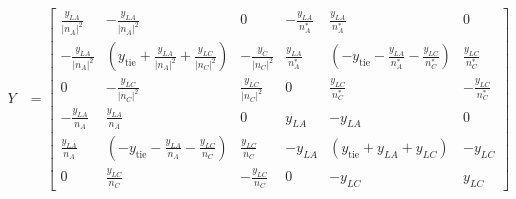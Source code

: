 \documentclass[10pt]{article}
\begin{document}
\begin{align}
Y &= 
\begin{bmatrix}
	\frac{y_{LA}}{|n_A|^2} & -\frac{y_{LA}}{|n_A|^2} & 0 & -\frac{y_{LA}}{n_A^*} & \frac{y_{LA}}{n_A^*} & 0 \\
	-\frac{y_{LA}}{|n_A|^2} & \left(y_\text{tie} + \frac{y_{LA}}{|n_A|^2} + \frac{y_{LC}}{|n_C|^2}\right) & -\frac{y_{C}}{|n_C|^2} & \frac{y_{LA}}{n_A^*} & \left(-y_\text{tie} -\frac{y_{LA}}{n_A^*} - \frac{y_{LC}}{n_C^*}\right) & \frac{y_{LC}}{n_C^*} \\
	0 & -\frac{y_{LC}}{|n_C|^2} & \frac{y_{LC}}{|n_C|^2} & 0 & \frac{y_{LC}}{n_C^*} &  -\frac{y_{LC}}{n_C^*} \\
	-\frac{y_{LA}}{n_A} & \frac{y_{LA}}{n_A} & 0 & y_{LA} & -y_{LA} & 0 \\
	\frac{y_{LA}}{n_A} & \left(-y_\text{tie} - \frac{y_{LA}}{n_A} - \frac{y_{LC}}{n_C}\right) & \frac{y_{LC}}{n_C} & -y_{LA} & \left(y_\text{tie} + y_{LA} + y_{LC}\right) & -y_{LC} \\
	0 & \frac{y_{LC}}{n_C} & -\frac{y_{LC}}{n_C} & 0 & -y_{LC}\ & y_{LC}
\end{bmatrix}
\end{align}
\end{document}

